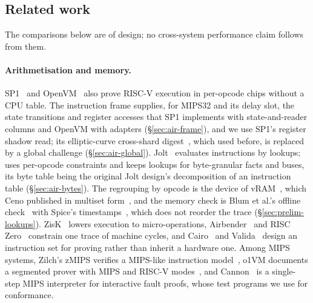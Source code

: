 \subsection{Related work}
\label{sec:related}

The comparisons below are of design; no cross-system performance claim follows from them.

\paragraph{Arithmetisation and memory.} SP1~\citep{sp1,sp1-hypercube} and OpenVM~\citep{openvm} also prove RISC-V execution in per-opcode chips without a CPU table. The instruction frame supplies, for MIPS32 and its delay slot, the state transitions and register accesses that SP1 implements with state-and-reader columns and OpenVM with adapters (\S\ref{sec:air-frame}), and we use SP1's register shadow read; its elliptic-curve cross-shard digest~\citep{sp1-turbo-memo}, which \Ziren{} used before, is replaced by a global challenge (\S\ref{sec:air-global}). Jolt~\citep{jolt,twist-shout} evaluates instructions by lookups; \Ziren{} uses per-opcode constraints and keeps lookups for byte-granular facts and buses, its byte table being the original Jolt design's decomposition of an instruction table (\S\ref{sec:air-bytes}). The regrouping by opcode is the device of vRAM~\citep{vram}, which Ceno published in multiset form~\citep{ceno,ceno-repo}, and the memory check is Blum et al.'s offline check~\citep{blum1994} with Spice's timestamps~\citep{spice}, which does not reorder the trace (\S\ref{sec:prelim-lookups}). ZisK~\citep{zisk} lowers execution to micro-operations, Airbender~\citep{airbender} and RISC Zero~\citep{risc0} constrain one trace of machine cycles, and Cairo~\citep{cairo} and Valida~\citep{valida} design an instruction set for proving rather than inherit a hardware one. Among MIPS systems, Zilch's zMIPS verifies a MIPS-like instruction model~\citep{zilch}, o1VM documents a segmented prover with MIPS and RISC-V modes~\citep{o1vm}, and Cannon~\citep{cannon} is a single-step MIPS interpreter for interactive fault proofs, whose test programs we use for conformance.


